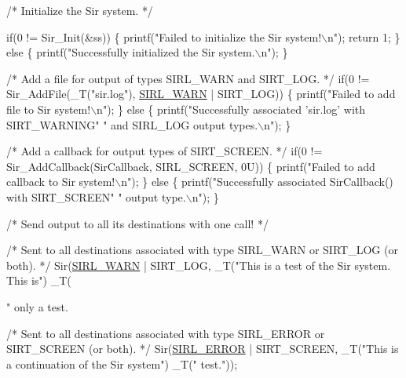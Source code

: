 \begin{DoxyCode}
\textcolor{comment}{/*}
\textcolor{comment}{  Initialize the Sir system.}
\textcolor{comment}{ */}

  \textcolor{keywordflow}{if}(0 != Sir\_Init(&ss)) \{
    printf(\textcolor{stringliteral}{"Failed to initialize the Sir system!\(\backslash\)n"});
    \textcolor{keywordflow}{return} 1;
  \} \textcolor{keywordflow}{else} \{
    printf(\textcolor{stringliteral}{"Successfully initialized the Sir system.\(\backslash\)n"});
  \}

\textcolor{comment}{/*}
\textcolor{comment}{  Add a file for output of types SIRL\_WARN and SIRT\_LOG.}
\textcolor{comment}{ */}
  \textcolor{keywordflow}{if}(0 != Sir\_AddFile(\_T(\textcolor{stringliteral}{"sir.log"}), \hyperlink{sir_8h_a4a3303c67acd49bea38fd3565d458cb2a9bfe1efbd321a009ad518b2eaec35881}{SIRL\_WARN} | SIRT\_LOG)) \{
    printf(\textcolor{stringliteral}{"Failed to add file to Sir system!\(\backslash\)n"});
  \} \textcolor{keywordflow}{else} \{
    printf(\textcolor{stringliteral}{"Successfully associated 'sir.log' with SIRT\_WARNING"}
           \textcolor{stringliteral}{" and SIRL\_LOG output types.\(\backslash\)n"});
  \}

\textcolor{comment}{/*}
\textcolor{comment}{  Add a callback for output types of SIRT\_SCREEN.}
\textcolor{comment}{ */}
  \textcolor{keywordflow}{if}(0 != Sir\_AddCallback(SirCallback, SIRL\_SCREEN, 0U)) \{
    printf(\textcolor{stringliteral}{"Failed to add callback to Sir system!\(\backslash\)n"});
  \} \textcolor{keywordflow}{else} \{
    printf(\textcolor{stringliteral}{"Successfully associated SirCallback() with SIRT\_SCREEN"}
           \textcolor{stringliteral}{" output type.\(\backslash\)n"});
  \}

\textcolor{comment}{/*}
\textcolor{comment}{  Send output to all its destinations with one call!}
\textcolor{comment}{ */}

\textcolor{comment}{/*}
\textcolor{comment}{  Sent to all destinations associated with type SIRL\_WARN or SIRT\_LOG}
\textcolor{comment}{  (or both).}
\textcolor{comment}{ */}
  Sir(\hyperlink{sir_8h_a4a3303c67acd49bea38fd3565d458cb2a9bfe1efbd321a009ad518b2eaec35881}{SIRL\_WARN} | SIRT\_LOG, \_T(\textcolor{stringliteral}{"This is a test of the Sir system. This is"})
      \_T(\textcolor{stringliteral}{" only a test. %

\textcolor{comment}{/*}
\textcolor{comment}{  Sent to all destinations associated with type SIRL\_ERROR or SIRT\_SCREEN}
\textcolor{comment}{  (or both).}
\textcolor{comment}{ */}
  Sir(\hyperlink{sir_8h_a4a3303c67acd49bea38fd3565d458cb2a9c687f088db1de838ea5d5f8a8beed76}{SIRL\_ERROR} | SIRT\_SCREEN, \_T(\textcolor{stringliteral}{"This is a continuation of the Sir system"})
      \_T(\textcolor{stringliteral}{" test."}));

}
\end{DoxyCode}
